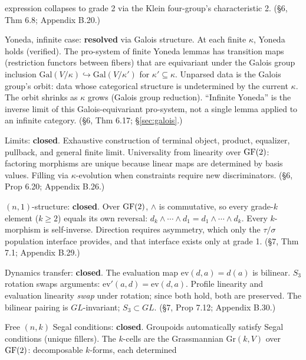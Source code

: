 \begin{description}[nosep,leftmargin=0.8cm]
    expression collapses to grade 2 via the Klein
    four-group's characteristic 2. (\S6, Thm 6.8;
    Appendix B.20.)
  \item[G7] Yoneda, infinite case: \textbf{resolved}
    via Galois structure. At each finite $\kappa$, Yoneda
    holds (verified). The pro-system of finite Yoneda
    lemmas has transition maps (restriction functors
    between fibers) that are equivariant under the Galois
    group inclusion $\mathrm{Gal}(V/\kappa) \hookrightarrow
    \mathrm{Gal}(V/\kappa')$ for $\kappa' \subseteq \kappa$.
    Unparsed data is the Galois group's orbit: data whose
    categorical structure is undetermined by the current
    $\kappa$. The orbit shrinks as $\kappa$ grows (Galois
    group reduction). ``Infinite Yoneda'' is the inverse
    limit of this Galois-equivariant pro-system, not a
    single lemma applied to an infinite category.
    (\S6, Thm 6.17; \S\ref{sec:galois}.)
  \item[G8] Limits: \textbf{closed}. Exhaustive
    construction of terminal object, product, equalizer,
    pullback, and general finite limit. Universality
    from linearity over $\operatorname{GF}(2)$: factoring morphisms
    are unique because linear maps are determined by
    basis values. Filling via $\kappa$-evolution when
    constraints require new discriminators.
    (\S6, Prop 6.20; Appendix B.26.)
  \item[G9] $(n,1)$-structure: \textbf{closed}. Over
    $\operatorname{GF}(2)$, $\wedge$ is commutative, so every grade-$k$
    element ($k \geq 2$) equals its own reversal:
    $d_k \wedge \cdots \wedge d_1 = d_1 \wedge \cdots
    \wedge d_k$. Every $k$-morphism is self-inverse.
    Direction requires asymmetry, which only the
    $\tau/\sigma$ population interface provides, and
    that interface exists only at grade 1.
    (\S7, Thm 7.1; Appendix B.29.)
  \item[G10] Dynamics transfer: \textbf{closed}. The
    evaluation map $\mathrm{ev}(d,a) = d(a)$ is bilinear.
    $S_3$ rotation swaps arguments:
    $\mathrm{ev}'(a,d) = \mathrm{ev}(d,a)$. Profile
    linearity and evaluation linearity \emph{swap} under
    rotation; since both hold, both are preserved.
    The bilinear pairing is $GL$-invariant; $S_3 \subset GL$.
    (\S7, Prop 7.12; Appendix B.30.)
  \item[G11] Free $(n,k)$ Segal conditions:
    \textbf{closed}. Groupoids automatically satisfy
    Segal conditions (unique fillers). The $k$-cells
    are the Grassmannian $\mathrm{Gr}(k, V)$ over
    $\operatorname{GF}(2)$: decomposable $k$-forms, each determined

\end{description}
